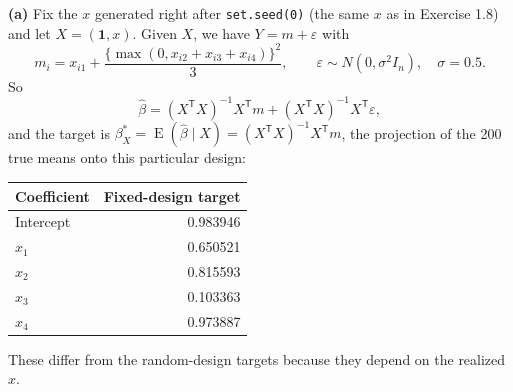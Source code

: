 \documentclass[answers,12pt,addpoints]{exam}
\providecommand{\E}{\operatorname{E}}
\newcommand{\trans}{^{\mathsf T}}
\newcommand{\ones}{\mathbf{1}}  %
\begin{document}
\begin{questions}
 
\begin{solution}
\textbf{(a)} Fix the $x$ generated right after \texttt{set.seed(0)} (the same
$x$ as in Exercise 1.8) and let $X=(\ones,x)$. Given $X$, we have
$Y=m+\varepsilon$ with
\[
m_i=x_{i1}+\frac{\{\max(0,x_{i2}+x_{i3}+x_{i4})\}^2}{3},
\qquad
\varepsilon\sim N(0,\sigma^2I_n),\quad \sigma=0.5 .
\]
So
\[
\widehat\beta=(X\trans X)^{-1}X\trans m+(X\trans X)^{-1}X\trans\varepsilon,
\]
and the target is
$\beta_X^*=\E(\widehat\beta\mid X)=(X\trans X)^{-1}X\trans m$, the projection
of the 200 true means onto this particular design:
\begin{center}
\begin{tabular}{lr}
\toprule
Coefficient & Fixed-design target\\
\midrule
Intercept & 0.983946\\
$x_1$     & 0.650521\\
$x_2$     & 0.815593\\
$x_3$     & 0.103363\\
$x_4$     & 0.973887\\
\bottomrule
\end{tabular}
\end{center}
These differ from the random-design targets because they depend on the
realized $x$.
 

\end{solution}
\end{questions}
\end{document}
